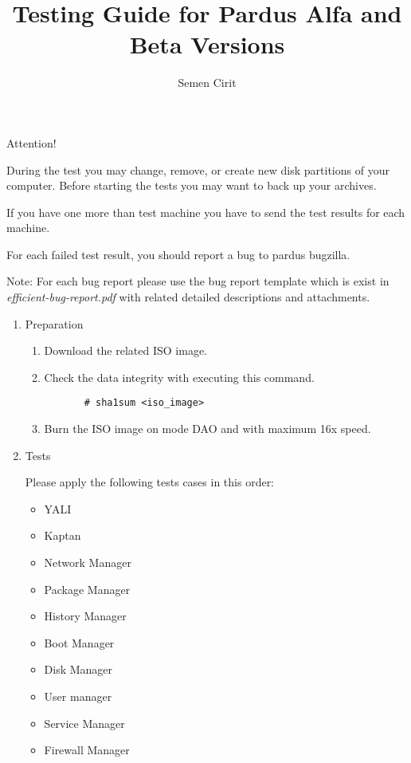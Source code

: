 \documentclass[a4paper,10pt]{article}
\title{Testing Guide for Pardus Alfa and Beta Versions}
\author{Semen Cirit}
\begin{document}
\maketitle

Attention!

    During the test you may change, remove, or create new disk partitions of your computer. 
    Before starting the tests you may want to back up your archives.
    
    
    If you have one more than test machine you have to send the test results for each machine.

    For each failed test result, you should report a bug to pardus bugzilla.

    Note: For each bug report please use the bug report template which is exist in \emph{efficient-bug-report.pdf} with related detailed descriptions and attachments. 

\begin{enumerate}
\item Preparation
  \begin{enumerate}
    \item Download the related ISO image.
    \item Check the data integrity with executing this command.
      \begin{verbatim}
       # sha1sum <iso_image>
      \end{verbatim}
    \item Burn the ISO image on mode DAO and with maximum 16x speed.
  \end{enumerate}
  \item Tests
    
    Please apply the following tests cases in this order:
    \begin{itemize}
    \item YALI
    \item Kaptan
    \item Network Manager
    \item Package Manager
    \item History Manager
    \item Boot Manager
    \item Disk Manager
    \item User manager
    \item Service Manager
    \item Firewall Manager
    \end{itemize}
 \end{enumerate}
\end{document}
